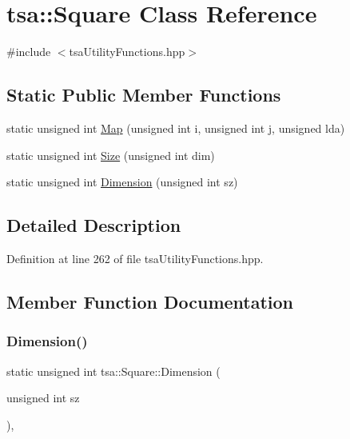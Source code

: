 \hypertarget{classtsa_1_1_square}{}\section{tsa\+:\+:Square Class Reference}
\label{classtsa_1_1_square}


{\ttfamily \#include $<$tsa\+Utility\+Functions.\+hpp$>$}

\subsection*{Static Public Member Functions}
\begin{DoxyCompactItemize}
\item 
static unsigned int \hyperlink{classtsa_1_1_square_adde315df70bffcc16a4293676d4e8efc}{Map} (unsigned int i, unsigned int j, unsigned lda)
\item 
static unsigned int \hyperlink{classtsa_1_1_square_a6ed8a7a76c2b315cdc7dee7ccf8d5395}{Size} (unsigned int dim)
\item 
static unsigned int \hyperlink{classtsa_1_1_square_aa2538e6f3c7086a4a7b25c21ac0d7f4d}{Dimension} (unsigned int sz)
\end{DoxyCompactItemize}


\subsection{Detailed Description}


Definition at line 262 of file tsa\+Utility\+Functions.\+hpp.



\subsection{Member Function Documentation}
\mbox{\label{classtsa_1_1_square_aa2538e6f3c7086a4a7b25c21ac0d7f4d}} 
\subsubsection{\texorpdfstring{Dimension()}{Dimension()}}
{\footnotesize\ttfamily static unsigned int tsa\+::\+Square\+::\+Dimension (\begin{DoxyParamCaption}\item[{unsigned int}]{sz }\end{DoxyParamCaption})\hspace{0.3cm}{\ttfamily [inline]}, {\ttfamily [static]}}



